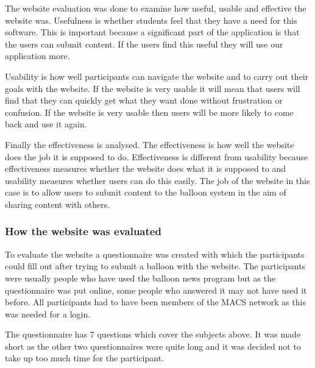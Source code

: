 \newcommand{\webEvalQPic}[1] {
  \begin{figure}[h]
  \begin{centering}
  \texttt{[image: Diagrams/Website-EvalQ\#1.png]}
  \par\end{centering}

  \caption{Evaluation results (Question #1)}
  \label{WebEvalQ#1}
  \end{figure}
}

The website evaluation was done to examine how useful, usable and effective the website was. Usefulness is whether students feel that they have a need for this software. This is important because a significant part of the application is that the users can submit content. If the users find this useful they will use our application more.

Usability is how well participants can navigate the website and to carry out their goals with the website. If the website is very usable it will mean that users will find that they can quickly get what they want done without frustration or confusion. If the website is very usable then users will be more likely to come back and use it again.

Finally the effectiveness is analysed. The effectiveness is how well the website does the job it is supposed to do. Effectiveness is different from usability because effectiveness measures whether the website does what it is supposed to and usability measures whether users can do this easily. The job of the website in this case is to allow users to submit content to the balloon system in the aim of sharing content with others.

\subsubsection{How the website was evaluated}

To evaluate the website a questionnaire was created with which the participants could fill out after trying to submit a balloon with the website. The participants were usually people who have used the balloon news program but as the questionnaire was put online, some people who answered it may not have used it before. All participants had to have been members of the MACS network as this was needed for a login.

The questionnaire has 7 questions which cover the subjects above. It was made short as the other two questionnaires were quite long and it was decided not to take up too much time for the participant.

